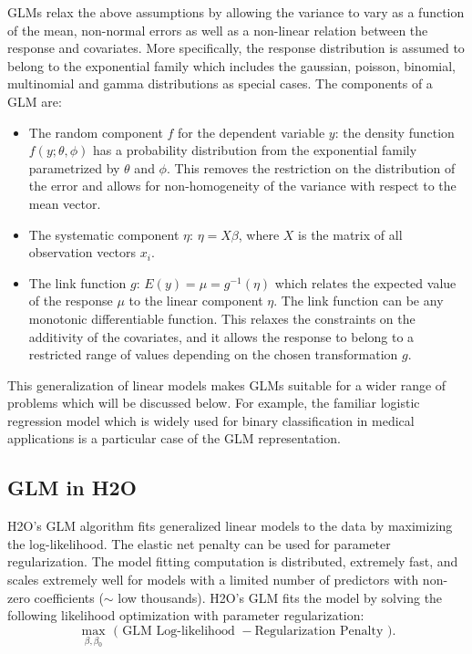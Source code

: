GLMs relax the above assumptions by allowing the variance to vary as a function of the mean, non-normal errors as well as a non-linear relation between the response and covariates. More specifically, the response distribution is assumed to belong to the exponential family which includes the gaussian, poisson, binomial, multinomial and gamma distributions as special cases. The components of a GLM are:
\begin{itemize}
\item The random component $f$ for the dependent variable $y$: the density function $f(y;\theta,\phi)$ has a probability distribution from the exponential family parametrized by $\theta$ and $\phi$. This removes the restriction on the distribution of the error and allows for non-homogeneity of the variance with respect to the mean vector.
\item The systematic component $\eta$: $\eta = X\beta$, where $X$ is the matrix of all observation vectors $x_i$.
\item The link function $g$: $E(y) = \mu = g^{-1}(\eta)$ which relates the expected value of the response $\mu$ to the linear component $\eta$. The link function can be any monotonic differentiable function. This relaxes the constraints on the additivity of the covariates, and it allows the response to belong to a restricted range of values depending on the chosen transformation $g$.
\end{itemize}


This generalization of linear models makes GLMs suitable for a wider range of problems which will be discussed below. For example, the familiar logistic regression model which is widely used for binary classification in medical applications is a particular case of the GLM representation. 


\subsection{GLM in H2O}
H2O's GLM algorithm fits generalized linear models to the data by maximizing the log-likelihood. The elastic net penalty can be used for parameter regularization. The model fitting computation is distributed, extremely fast, and scales extremely well for models with a limited number of predictors with non-zero coefficients ($\mathtt{\sim}$ low thousands).  H2O's GLM fits the model by solving the following likelihood optimization with parameter regularization:
 $$\max_{\beta,\beta_0} \mbox{  ( GLM Log-likelihood }  - \mbox{Regularization Penalty )} .$$

